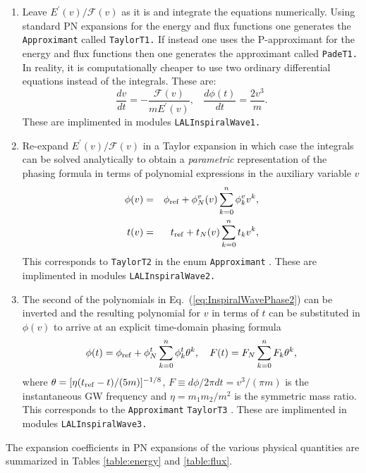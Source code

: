 \begin{enumerate}
\item Leave  $E^{\prime}(v)/\mathcal{F}(v)$ as it is and integrate the 
equations numerically. Using standard PN expansions for the
energy and flux functions one generates the {\tt Approximant} called \texttt{TaylorT1.}
If instead one uses the P-approximant for the energy and flux functions
\cite{dis3,dis1} then one generates the approximant called \texttt{PadeT1.} 
In reality, it is computationally cheaper to use two ordinary differential
equations instead of the integrals. These are:
\begin{equation}
\frac{dv}{dt} = - \frac{\mathcal{F}(v)}{m E^{\prime}(v)},\ \ \ \ 
\frac{d \phi(t)}{dt} = \frac{2v^{3}}{m}.
\label{eq:ode2}
\end{equation}
These are implimented in modules {\tt LALInspiralWave1.}
 
\item Re-expand $E^{\prime}(v)/\mathcal{F}(v)$ in a Taylor expansion
in which case the integrals can be solved analytically to obtain a 
{\it parametric} representation of the phasing formula in terms of 
polynomial expressions in the auxiliary variable $v$
\begin {eqnarray}
\phi(v)&=& \phi_{\rm ref} +
\phi^v_N (v)\sum_{k=0}^{n} {\phi}^v_k v^k, \nonumber\\
t(v)&=& t_{\rm ref} +t_N(v) \sum_{k=0}^{n} {t}_k v^k,
\label{eq:InspiralWavePhase2}
\end {eqnarray}
This corresponds to \texttt{TaylorT2} in the enum \texttt{Approximant} \cite{dis3}.
These are implimented in modules {\tt LALInspiralWave2.}
 
\item The second of the polynomials in Eq.~(\ref{eq:InspiralWavePhase2}) can
be inverted and the resulting polynomial for $v$ in terms of
$t$ can be substituted in $\phi(v)$ to arrive at an explicit  time-domain
phasing formula
\begin{equation}
\phi(t)=\phi_{\rm ref}+\phi_N^t \sum_{k=0}^{n}
{\phi}^t_k\theta^k, \ \ \ 
F(t)= F_N \sum_{k=0}^{n} {F}_k \theta^k,
\label{eq:InspiralWavePhase3}
\end{equation}         
where $\theta=[\eta (t_{\rm ref}-t)/(5m)]^{-1/8}$, 
$F \equiv d \phi/ 2 \pi dt =v^3/(\pi m)$ is the instantaneous GW frequency
and $\eta=m_1 m_2/m^2$ is the symmetric mass ratio.
This corresponds to the {\tt Approximant} \texttt{TaylorT3}  \cite{BDIWW,BIWW,dis3}.
These are implimented in modules {\tt LALInspiralWave3.}
\end{enumerate}
The expansion coefficients in PN expansions of the various physical
quantities are summarized in Tables \ref{table:energy} and \ref{table:flux}.

